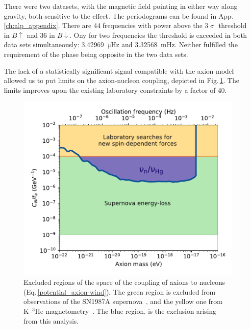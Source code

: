 There were two datasets, with the magnetic field pointing in either way along gravity, both sensitive to the effect.
The periodograms can be found in App.\,\ref{ch:alp_appendix}.
There are 44 frequencies with power above the 3$\upsigma$ threshold in $B\uparrow$ and 36 in $B\downarrow$.
Ony for two frequencies the threshold is exceeded in both data sets simultaneously: \SI{3.42969}{\micro\hertz} and \SI{3.32568}{\milli\hertz}.
Neither  fulfilled the requirement of the phase being opposite in the two data sets.

The lack of a statistically significant signal compatible with the axion model allowed us to put limits on the axion-nucleon coupling, depicted in Fig.\,\ref{fig:axions_wind_limits}. The limits improves upon the existing laboratory constraints by a factor of 40.

\begin{figure}
  \centering
  \includegraphics[width=\linewidth]{gfx/axions/psi_ill_axion_wind_limits_v1.pdf}
  \caption{Excluded regions of the space of the coupling of axions to nucleons (Eq.\,\ref{potential_axion-wind}). The green region is excluded from observations of the SN1987A supernova~\cite{PhysRevX.7.041034}, and the yellow one from K--${}^3$He magnetometry~\cite{Romalis2009_NF}. The blue region, is the exclusion arising from this analysis.}\label{fig:axions_wind_limits}
\end{figure}




